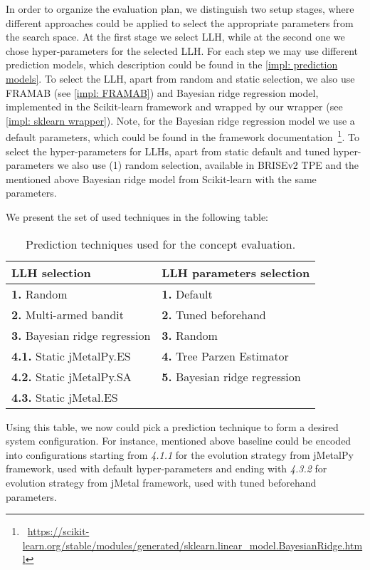In order to organize the evaluation plan, we distinguish two setup stages, where different approaches could be applied to select the appropriate parameters from the search space. 
At the first stage we select LLH, while at the second one we chose hyper-parameters for the selected LLH. For each step we may use different prediction models, which description could be found in the \cref{impl: prediction models}. To select the LLH, apart from random and static selection, we also use FRAMAB (see \cref{impl: FRAMAB}) and Bayesian ridge regression model, implemented in the Scikit-learn framework and wrapped by our wrapper (see \cref{impl: sklearn wrapper}). Note, for the Bayesian ridge regression model we use a default parameters, which could be found in the framework documentation~\footnote{~\url{https://scikit-learn.org/stable/modules/generated/sklearn.linear_model.BayesianRidge.html}}. To select the hyper-parameters for LLHs, apart from static default and tuned hyper-parameters we also use (1) random selection, available in BRISEv2 TPE and the mentioned above Bayesian ridge model from Scikit-learn with the same parameters.

We present the set of used techniques in the following table:
\begin{table}[h!]
	\centering
	\begin{tabular}{l||l}
		\textbf{LLH selection} & \textbf{LLH parameters selection} \\
		\hline
		\hline
		\textbf{1.} Random & \textbf{1.} Default \\
		\textbf{2.} Multi-armed bandit & \textbf{2.} Tuned beforehand \\
		\textbf{3.} Bayesian ridge regression & \textbf{3.} Random \\
		\textbf{4.1.} Static jMetalPy.ES & \textbf{4.} Tree Parzen Estimator \\
		\textbf{4.2.} Static jMetalPy.SA & \textbf{5.} Bayesian ridge regression\\
		\textbf{4.3.} Static jMetal.ES & 
	\end{tabular}
	
	\caption{Prediction techniques used for the concept evaluation.}
	\label{eval: concept settings table}
\end{table}


Using this table, we now could pick a prediction technique to form a desired system configuration. For instance, mentioned above baseline could be encoded into configurations starting from \emph{4.1.1} for the evolution strategy from jMetalPy framework, used with default hyper-parameters and ending with \emph{4.3.2} for evolution strategy from jMetal framework, used with tuned beforehand parameters.

